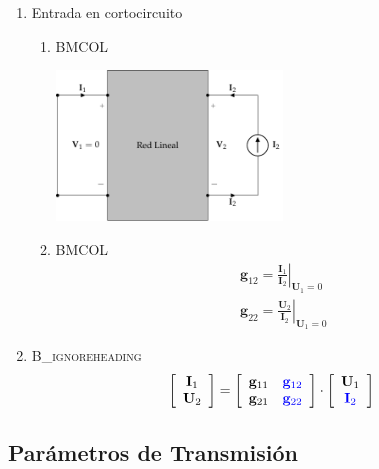 \begin{enumerate}
\item Entrada en cortocircuito
\label{sec:org5a8ad67}

\begin{enumerate}
\item \hfill{}\textsc{BMCOL}
\label{sec:org71212cd}

\includegraphics[height=4cm]{../figs/parametrosG_salida.pdf}


\item \hfill{}\textsc{BMCOL}
\label{sec:org0f2ee52}
\renewcommand{\arraystretch}{2}
\[
  \begin{array}{c}
    \mathbf{g}_{12} = \left.\frac{\mathbf{I}_1}{\mathbf{I}_2}\right\rvert_{\mathbf{U}_1 = 0}\\
    \mathbf{g}_{22} = \left.\frac{\mathbf{U}_2}{\mathbf{I}_2}\right\rvert_{\mathbf{U}_1 = 0}
  \end{array}
\]
\end{enumerate}

\item \hfill{}\textsc{B\_ignoreheading}
\label{sec:org5b626bc}
\[
  \left[
    \begin{array}{c}
      \mathbf{I}_1\\
      \mathbf{U}_2
    \end{array}
  \right] =
  \left[
    \begin{array}{cc}
      \mathbf{g}_{11} & \color{blue}{\mathbf{g}_{12}}\\
      \mathbf{g}_{21} & \color{blue}{\mathbf{g}_{22}}
    \end{array}
  \right] \cdot
  \left[
    \begin{array}{c}
      \mathbf{U}_1\\
      \color{blue}{\mathbf{I}_2}
    \end{array}
  \right]
\]
\end{enumerate}


\subsection{Parámetros de Transmisión}
\label{sec:orgd5598b8}

